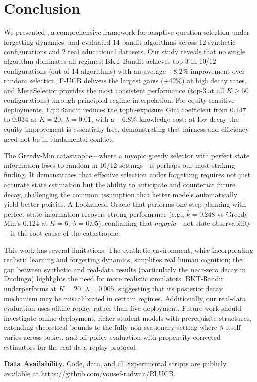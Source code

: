 \section{Conclusion}
\label{sec:conclusion}

We presented \ours, a comprehensive framework for adaptive question selection under forgetting dynamics, and evaluated 14 bandit algorithms across 12 synthetic configurations and 2 real educational datasets.
Our study reveals that no single algorithm dominates all regimes: BKT-Bandit achieves top-3 in 10/12 configurations (out of 14 algorithms) with an average $+8.2\%$ improvement over random selection, F-UCB delivers the largest gains ($+42\%$) at high decay rates, and MetaSelector provides the most consistent performance (top-3 at all $K{\geq}50$ configurations) through principled regime interpolation.
For equity-sensitive deployments, EquiBandit reduces the topic-exposure Gini coefficient from $0.447$ to $0.034$ at $K{=}20$, $\lambda{=}0.01$, with a $-6.8\%$ knowledge cost; at low decay the equity improvement is essentially free, demonstrating that fairness and efficiency need not be in fundamental conflict.

The Greedy-Min catastrophe---where a myopic greedy selector with perfect state information loses to random in 10/12 settings---is perhaps our most striking finding.
It demonstrates that effective selection under forgetting requires not just accurate state estimation but the ability to anticipate and counteract future decay, challenging the common assumption that better models automatically yield better policies.
A Lookahead Oracle that performs one-step planning with perfect state information recovers strong performance (e.g., $\bar{k}{=}0.248$ vs Greedy-Min's $0.124$ at $K{=}6$, $\lambda{=}0.05$), confirming that \emph{myopia}---not state observability---is the root cause of the catastrophe.

This work has several limitations.
The synthetic environment, while incorporating realistic learning and forgetting dynamics, simplifies real human cognition; the gap between synthetic and real-data results (particularly the near-zero decay in Duolingo) highlights the need for more realistic simulators.
BKT-Bandit underperforms at $K{=}20$, $\lambda{=}0.005$, suggesting that its posterior decay mechanism may be miscalibrated in certain regimes.
Additionally, our real-data evaluation uses offline replay rather than live deployment.
Future work should investigate online deployment, richer student models with prerequisite structures, extending theoretical bounds to the fully non-stationary setting where $\lambda$ itself varies across topics, and off-policy evaluation with propensity-corrected estimators for the real-data replay protocol.

\noindent\textbf{Data Availability.}
Code, data, and all experimental scripts are publicly available at \url{https://github.com/yousef-radwan/RLUCB}.
